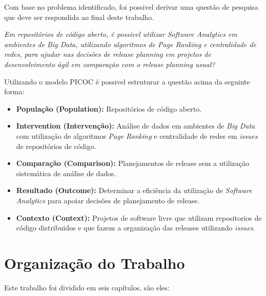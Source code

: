 Com base no problema identificado, foi possivel derivar uma questão de pesquisa
que deve ser respondida ao final deste trabalho.

\begin{center}
    \textit{Em repositórios de código aberto, é possivel utilizar Software Analytics
            em ambientes de Big Data, utilizando algoritmos de Page Ranking e centralidade
            de redes, para ajudar nas decisões de release planning em projetos de desenvolvimento
            ágil em comparação com o release planning usual?}
\end{center}

Utilizando o modelo PICOC é possivel estruturar a questão acima da seguinte forma:

\begin{itemize}
    \item \textbf{População (Population):} Repositórios de código aberto.
    \item \textbf{Intervention (Intervenção):} Análise de dados em ambientes de
        \textit{Big Data} com utilização de algoritmos \textit{Page Ranking} e
        centralidade de redes em \textit{issues} de repositórios de código.
    \item \textbf{Comparação (Comparison):} Planejamentos de release sem a utilização
        sistemática de análise de dados.
    \item \textbf{Resultado  (Outcome):} Determinar a eficiência da utilização de
        \textit{Software Analytics} para apoiar decisões de planejamento de release.
    \item \textbf{Contexto (Context):} Projetos de software livre que utilizam
        repositorios de código distribuidos e que fazem a organização das releases
        utilizando \textit{issues}.
\end{itemize}


\section{Organização do Trabalho}
Este trabalho foi dividido em seis capítulos, são eles:

